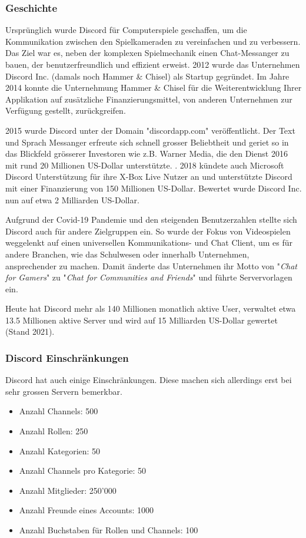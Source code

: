 \documentclass[a4paper, table]{article}
\begin{document}
\subsubsection*{Geschichte}
Urspr\"unglich wurde Discord f\"ur Computerspiele geschaffen, um die Kommunikation zwischen den Spielkameraden zu vereinfachen und zu verbessern.
Das Ziel war es, neben der komplexen Spielmechanik einen Chat-Messanger zu bauen, der benutzerfreundlich und effizient erweist.
2012 wurde das Unternehmen Discord Inc. (damals noch Hammer \& Chisel) als Startup gegr\"undet.\autocite{noauthor_discord_2021}
Im Jahre 2014 konnte die Unternehmung Hammer \& Chisel f\"ur die Weiterentwicklung Ihrer Applikation auf zus\"atzliche Finanzierungsmittel, von anderen Unternehmen zur Verfügung gestellt, zurückgreifen.

2015 wurde Discord unter der Domain "discordapp.com" ver\"offentlicht.
Der Text und Sprach Messanger erfreute sich schnell grosser Beliebtheit und geriet so in das Blickfeld grösserer Investoren wie z.B. Warner Media, die den Dienst 2016 mit rund 20 Millionen US-Dollar unterstützte. \autocite{noauthor_warner_2022} .
2018 k\"undete auch Microsoft Discord Unterst\"utzung f\"ur ihre X-Box Live Nutzer an und unterst\"utzte Discord mit einer Finanzierung von 150 Millionen US-Dollar. Bewertet wurde Discord Inc. nun auf etwa 2 Milliarden US-Dollar.

Aufgrund der Covid-19 Pandemie und den steigenden Benutzerzahlen stellte sich Discord auch f\"ur andere Zielgruppen ein.
So wurde der Fokus von Videospielen weggelenkt auf einen universellen Kommunikations- und Chat Client, um es f\"ur andere Branchen, wie das Schulwesen oder innerhalb Unternehmen, ansprechender zu machen.
Damit \"anderte das Unternehmen ihr Motto von "\textit{Chat for Gamers}" zu "\textit{Chat for Communities and Friends}" und f\"uhrte Servervorlagen ein.

Heute hat Discord mehr als 140 Millionen monatlich aktive User, verwaltet etwa 13.5 Millionen aktive Server und wird auf 15 Milliarden US-Dollar gewertet (Stand 2021). \autocite{david_curry_discord_2022}

\subsubsection*{Discord Einschr\"ankungen}\label{discord_einschraenkungen}
Discord hat auch einige Einschränkungen.
Diese machen sich allerdings erst bei sehr grossen Servern bemerkbar.\autocite{vultaggio_discord_2022}
\begin{itemize}
    \item Anzahl Channels: 500
    \item Anzahl Rollen: 250
    \item Anzahl Kategorien: 50
    \item Anzahl Channels pro Kategorie: 50
    \item Anzahl Mitglieder: 250'000
    \item Anzahl Freunde eines Accounts: 1000
    \item Anzahl Buchstaben für Rollen und Channels: 100
\end{itemize}
\end{document}
